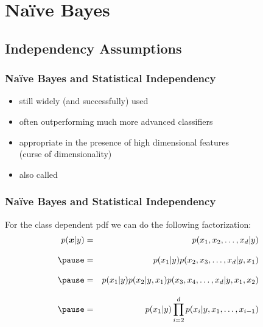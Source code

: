 \section{Na{\"i}ve Bayes}

\subsection{Independency Assumptions}

\begin{frame}
  \frametitle{Na{\"i}ve Bayes and Statistical Independency}
  

   \begin{itemize}
    \item still widely (and successfully) used \\[.5cm]
    \item often outperforming much more advanced classifiers \\[.5cm]
    \item appropriate in the presence of high dimensional features\\ (curse of dimensionality) \\[.5cm]
    \item also called 
   \end{itemize}
 \end{frame}
 
 
\begin{frame}
  \frametitle{Na{\"i}ve Bayes and Statistical Independency \cont}

  For the class dependent pdf we can do the following factorization:
%
  \begin{eqnarray*}
    p(\vec x| y) &=& p(x_1, x_2, \dots, x_d |y) \\[.3cm] \pause
                 &=& p(x_1|y)p(x_2, x_3,\dots, x_d | y, x_1) \\[.3cm] \pause
                 &=& p(x_1|y)p(x_2|y,x_1)p(x_3,x_4,\dots, x_d | y, x_1, x_2) \\[.3cm] \pause
                 &=& p(x_1|y)\prod_{i=2}^d p(x_i|y, x_1,\dots,x_{i-1})
  \end{eqnarray*}
\end{frame}
 
